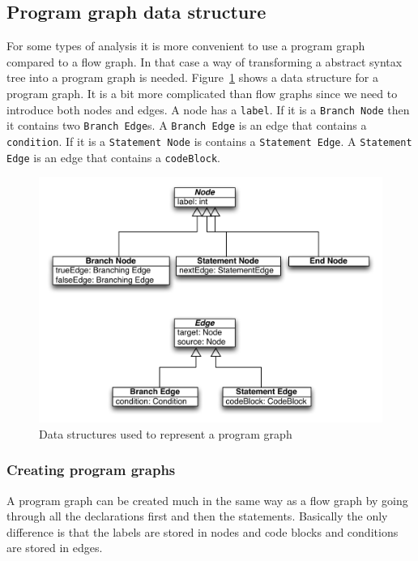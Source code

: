 \subsection{Program graph data structure}
For some types of analysis it is more convenient to use a program graph compared to a flow graph. In that case a way of transforming a abstract syntax tree into a program graph is needed. Figure~\ref{fig:programgraph} shows a data structure for a program graph. It is a bit more complicated than flow graphs since we need to introduce both nodes and edges. A node has a \texttt{label}. If it is a \texttt{Branch Node} then it contains two \texttt{Branch Edge}s. A \texttt{Branch Edge} is an edge that contains a \texttt{condition}. If it is a \texttt{Statement Node} is contains a \texttt{Statement Edge}. A \texttt{Statement Edge} is an edge that contains a \texttt{codeBlock}.

\begin{figure}[h]
	\centering
	\includegraphics[scale=1.0]{../img/program_graph}
	\caption{Data structures used to represent a program graph}
	\label{fig:programgraph}
\end{figure}

\subsubsection{Creating program graphs}
A program graph can be created much in the same way as a flow graph by going through all the declarations first and then the statements. Basically the only difference is that the labels are stored in nodes and code blocks and conditions are stored in edges.


